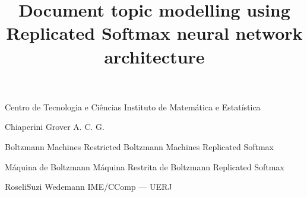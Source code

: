 
            {Centro de Tecnologia e Ciências}
            {Instituto de Matemática e Estatística}
            {}

      {Chiaperini Grover}
      {A. C. G.}

\title{Document topic modelling using Replicated Softmax neural network architecture}
         {Boltzmann Machines}
         {Restricted Boltzmann Machines}
         {Replicated Softmax}

               {Máquina de Boltzmann}
               {Máquina Restrita de Boltzmann}
               {Replicated Softmax}

           {Roseli}{Suzi Wedemann} 
           {IME/CComp --- UERJ} 





